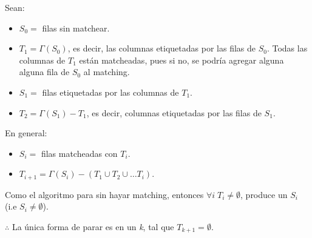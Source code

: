 \documentclass[12pt,a4paper]{report}
\newcounter{neq}
\begin{document}
			\vspace{5mm}
			Sean:
			\begin{itemize}
				\item $S_{0} =$ filas sin matchear.
				\item $T_{1} = \Gamma(S_{0})$, es decir, las columnas etiquetadas por las filas de $S_{0}$. Todas las columnas de $T_{1}$ están matcheadas, pues si no, se podría agregar alguna alguna fila de $S_{0}$ al matching.
				\item $S_{1} =$ filas etiquetadas por las columnas de $T_{1}$.
				\item $T_{2} = \Gamma(S_{1}) - T_{1}$, es decir, columnas etiquetadas por las filas de $S_{1}$.
			\end{itemize}

			En general:
			\begin{center}
			\begin{itemize}
				\item $S_{i} =$ filas matcheadas con $T_{i}$.
				\item $T_{i+1} = \Gamma(S_{i}) - (T_{1} \cup T_{2} \cup \dotsc T_{i})$.
			\end{itemize}
			\end{center}

			Como el algoritmo para sin hayar matching, entonces $\forall i \; T_{i} \neq \emptyset $, produce un $S_{i}$  (i.e $S_{i} \neq \emptyset$).

			$\therefore$ La única forma de parar es en un \textit{k}, tal que $T_{k+1} = \emptyset$.
\end{document}

